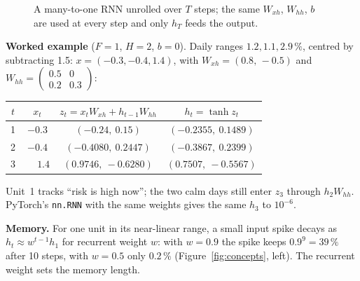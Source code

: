 \documentclass[11pt, a4paper]{article}
\begin{document}
\begin{figure}[H]
\centering
{}
\caption{A many-to-one RNN unrolled over $T$ steps; the same $W_{xh}$, $W_{hh}$, $b$ are used at every step and only $h_T$ feeds the output.}
\label{fig:unroll}
\end{figure}

\textbf{Worked example} ($F=1$, $H=2$, $b=0$). Daily ranges $1.2, 1.1, 2.9\,\%$, centred by subtracting 1.5: $x=(-0.3,-0.4,1.4)$, with
$W_{xh}=(0.8,\,-0.5)$ and $W_{hh}=\begin{pmatrix}0.5&0\\0.2&0.3\end{pmatrix}$:

\begin{center}
\small
\begin{tabular}{cccc}
\toprule
$t$ & $x_t$ & $z_t=x_tW_{xh}+h_{t-1}W_{hh}$ & $h_t=\tanh z_t$ \\
\midrule
1 & $-0.3$ & $(-0.24,\ 0.15)$ & $(-0.2355,\ 0.1489)$ \\
2 & $-0.4$ & $(-0.4080,\ 0.2447)$ & $(-0.3867,\ 0.2399)$ \\
3 & $\phantom{-}1.4$ & $(0.9746,\ -0.6280)$ & $(0.7507,\ -0.5567)$ \\
\bottomrule
\end{tabular}
\end{center}
Unit~1 tracks ``risk is high now''; the two calm days still enter $z_3$ through $h_2W_{hh}$. PyTorch's \texttt{nn.RNN} with the same weights gives the same $h_3$ to $10^{-6}$.

\textbf{Memory.} For one unit in its near-linear range, a small input spike decays as $h_t\approx w^{t-1}h_1$ for recurrent weight $w$: with $w=0.9$ the spike keeps
$0.9^{9}=39\,\%$ after 10 steps, with $w=0.5$ only $0.2\,\%$ (Figure~\ref{fig:concepts}, left). The recurrent weight sets the memory length.
\end{document}
